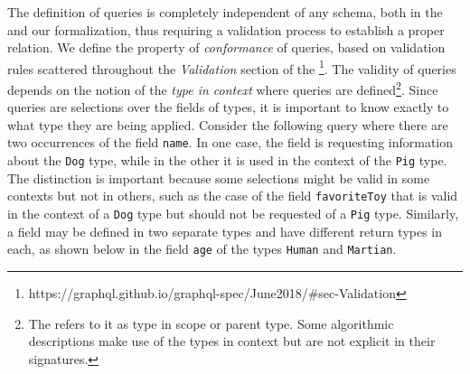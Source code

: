 The definition of queries is completely independent of any schema, both in the \spec{} and our formalization, thus requiring a validation process to establish a proper relation. We define the property of \textit{conformance} of queries, based on validation rules scattered throughout the \textit{Validation} section of the \spec{}\footnote{https://graphql.github.io/graphql-spec/June2018/\#sec-Validation}. The validity of queries depends on the notion of the \textit{type in context} where queries are defined\footnote{The \spec{} refers to it as type in scope or parent type. Some algorithmic descriptions make use of the types in context but are not explicit in their signatures.}. Since queries are selections over the fields of types, it is important to know exactly to what type they are being applied. Consider the following query where there are two occurrences of the field \texttt{name}. In one case, the field is requesting information about the \texttt{Dog} type, while in the other it is used in the context of the \texttt{Pig} type. The distinction is important because some selections might be valid in some contexts but not in others, such as the case of the field \texttt{favoriteToy} that is valid in the context of a \texttt{Dog} type but should not be requested of a \texttt{Pig} type. Similarly, a field may be defined in two separate types and have different return types in each, as shown below in the field \texttt{age} of the types \texttt{Human} and \texttt{Martian}.



